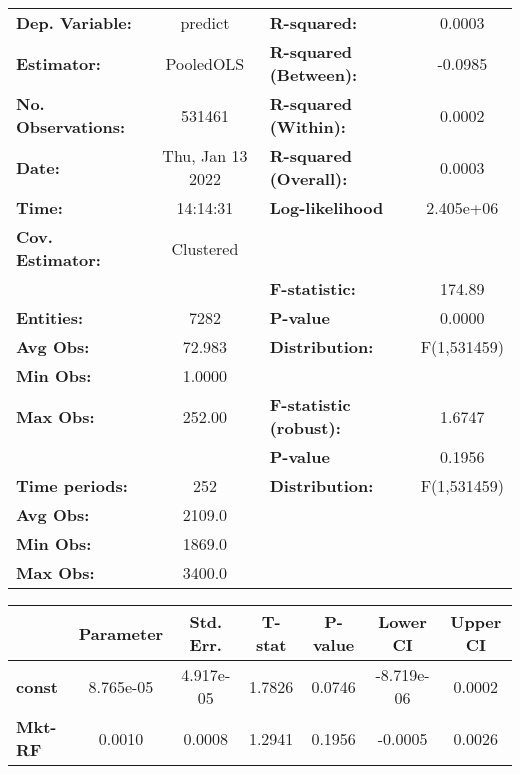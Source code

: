 \begin{center}
\begin{tabular}{lclc}
\toprule
\textbf{Dep. Variable:}    &      predict       & \textbf{  R-squared:         }   &      0.0003      \\
\textbf{Estimator:}        &     PooledOLS      & \textbf{  R-squared (Between):}  &     -0.0985      \\
\textbf{No. Observations:} &       531461       & \textbf{  R-squared (Within):}   &      0.0002      \\
\textbf{Date:}             &  Thu, Jan 13 2022  & \textbf{  R-squared (Overall):}  &      0.0003      \\
\textbf{Time:}             &      14:14:31      & \textbf{  Log-likelihood     }   &    2.405e+06     \\
\textbf{Cov. Estimator:}   &     Clustered      & \textbf{                     }   &                  \\
\textbf{}                  &                    & \textbf{  F-statistic:       }   &      174.89      \\
\textbf{Entities:}         &        7282        & \textbf{  P-value            }   &      0.0000      \\
\textbf{Avg Obs:}          &       72.983       & \textbf{  Distribution:      }   &   F(1,531459)    \\
\textbf{Min Obs:}          &       1.0000       & \textbf{                     }   &                  \\
\textbf{Max Obs:}          &       252.00       & \textbf{  F-statistic (robust):} &      1.6747      \\
\textbf{}                  &                    & \textbf{  P-value            }   &      0.1956      \\
\textbf{Time periods:}     &        252         & \textbf{  Distribution:      }   &   F(1,531459)    \\
\textbf{Avg Obs:}          &       2109.0       & \textbf{                     }   &                  \\
\textbf{Min Obs:}          &       1869.0       & \textbf{                     }   &                  \\
\textbf{Max Obs:}          &       3400.0       & \textbf{                     }   &                  \\
\bottomrule
\end{tabular}
\begin{tabular}{lcccccc}
                & \textbf{Parameter} & \textbf{Std. Err.} & \textbf{T-stat} & \textbf{P-value} & \textbf{Lower CI} & \textbf{Upper CI}  \\
\midrule
\textbf{const}  &     8.765e-05      &     4.917e-05      &      1.7826     &      0.0746      &     -8.719e-06    &       0.0002       \\
\textbf{Mkt-RF} &       0.0010       &       0.0008       &      1.2941     &      0.1956      &      -0.0005      &       0.0026       \\
\bottomrule
\end{tabular}
\end{center}
